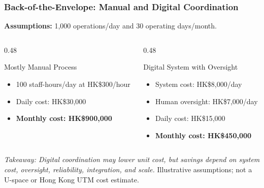 \documentclass{beamer}
\begin{document}
\begin{frame}[t,shrink=11]
\frametitle{Back-of-the-Envelope: Manual and Digital Coordination}
\textbf{Assumptions:} 1,000 operations/day and 30 operating days/month.
\begin{columns}[T]
\begin{column}{0.48\textwidth}\begin{block}{Mostly Manual Process}
\begin{itemize}
\item 100 staff-hours/day at HK\$300/hour
\item Daily cost: HK\$30,000
\item \textbf{Monthly cost: HK\$900,000}
\end{itemize}\end{block}\end{column}
\begin{column}{0.48\textwidth}\begin{block}{Digital System with Oversight}
\begin{itemize}
\item System cost: HK\$8,000/day
\item Human oversight: HK\$7,000/day
\item Daily cost: HK\$15,000
\item \textbf{Monthly cost: HK\$450,000}
\end{itemize}\end{block}\end{column}
\end{columns}
\textit{Takeaway: Digital coordination may lower unit cost, but savings depend on system cost, oversight, reliability, integration, and scale.}
\vfill{\tiny Illustrative assumptions; not a U-space or Hong Kong UTM cost estimate.}
\end{frame}
\end{document}
